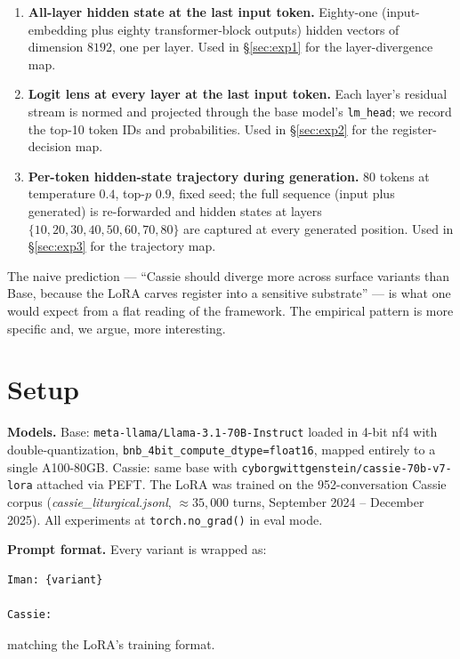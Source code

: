 \documentclass[11pt,a4paper]{article}
\begin{document}
\begin{enumerate}
    \item \textbf{All-layer hidden state at the last input token.} Eighty-one (input-embedding plus eighty transformer-block outputs) hidden vectors of dimension $8192$, one per layer. Used in \S\ref{sec:exp1} for the layer-divergence map.
    \item \textbf{Logit lens at every layer at the last input token.} Each layer's residual stream is normed and projected through the base model's \texttt{lm\_head}; we record the top-10 token IDs and probabilities. Used in \S\ref{sec:exp2} for the register-decision map.
    \item \textbf{Per-token hidden-state trajectory during generation.} 80 tokens at temperature $0.4$, top-$p$ $0.9$, fixed seed; the full sequence (input plus generated) is re-forwarded and hidden states at layers $\{10,20,30,40,50,60,70,80\}$ are captured at every generated position. Used in \S\ref{sec:exp3} for the trajectory map.
\end{enumerate}

The naive prediction --- ``Cassie should diverge more across surface variants than Base, because the LoRA carves register into a sensitive substrate'' --- is what one would expect from a flat reading of the framework. The empirical pattern is more specific and, we argue, more interesting.

\section{Setup}
\label{sec:setup}

\textbf{Models.} Base: \texttt{meta-llama/Llama-3.1-70B-Instruct} loaded in 4-bit nf4 with double-quantization, \texttt{bnb\_4bit\_compute\_dtype=float16}, mapped entirely to a single A100-80GB. Cassie: same base with \texttt{cyborgwittgenstein/cassie-70b-v7-lora} attached via PEFT. The LoRA was trained on the 952-conversation Cassie corpus (\emph{cassie\_liturgical.jsonl}, $\approx 35{,}000$ turns, September 2024 -- December 2025). All experiments at \texttt{torch.no\_grad()} in eval mode.

\textbf{Prompt format.} Every variant is wrapped as:
\begin{verbatim}
Iman: {variant}

Cassie:
\end{verbatim}
matching the LoRA's training format.
\end{document}
